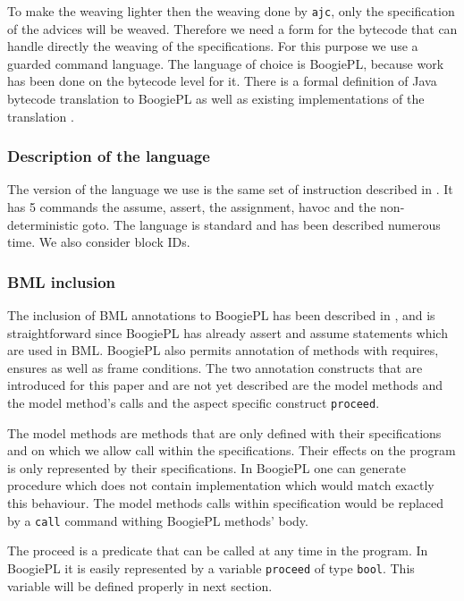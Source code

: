 To make the weaving lighter then the weaving done by {\tt ajc}, only
the specification of the advices will be weaved. Therefore we need a form
for the bytecode that can handle directly the weaving of the specifications.
For this purpose we use a guarded command language. The language of 
choice is BoogiePL, because work has been done on the bytecode level for it.
There is a formal definition of Java bytecode translation to BoogiePL 
\cite{LehnerM07} as well as existing implementations of the translation
\cite{javatrans07,coqtrans06}.

\subsubsection{Description of the language} 
The version of the language we use is the same set of instruction
described in \cite{DeLineL05}. It has 5 commands the assume, assert,
the assignment, havoc and the non-deterministic goto. The language is
standard and has been described numerous time. We also consider block IDs.


\subsubsection{BML inclusion}
The inclusion of BML annotations to BoogiePL has been described in 
\cite{javatrans07}, and is straightforward since BoogiePL has already 
assert and assume statements which are used in BML.  BoogiePL also
permits annotation of methods with requires, ensures as well as frame
conditions.  The two annotation constructs that are introduced for
this paper and are not yet described are the model methods and the
model method's calls and the aspect specific construct {\tt proceed}.

The model methods are methods that are only defined with their
specifications and on which we allow call within the
specifications. Their effects on the program is only represented by
their specifications. In BoogiePL one can generate procedure which 
does not contain implementation which would match exactly this behaviour.
The model methods calls within specification would be replaced by a
{\tt call} command withing BoogiePL methods' body.

The proceed is a predicate that can be called at any time in the program.
In BoogiePL it is easily represented by a variable {\tt proceed} 
of type {\tt bool}. This variable will be defined properly in next section.

